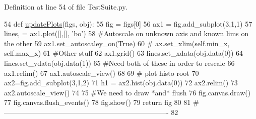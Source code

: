 Definition at line 54 of file Test\+Suite.\+py.


\begin{DoxyCode}
54 \textcolor{keyword}{def }\hyperlink{namespaceTestSuite_afd38321f5736c9a017d24fcee3206fed}{updatePlots}(figs, obj):
55     fig = figs[0]
56     ax1 = fig.add\_subplot(3,1,1)
57     lines, = ax1.plot([],[], \textcolor{stringliteral}{'bo'})
58     \textcolor{comment}{#Autoscale on unknown axis and known lims on the other}
59     ax1.set\_autoscaley\_on(\textcolor{keyword}{True})
60 \textcolor{comment}{#    ax.set\_xlim(self.min\_x, self.max\_x)}
61     \textcolor{comment}{#Other stuff}
62     ax1.grid()        
63     lines.set\_xdata(obj.data(0))
64     lines.set\_ydata(obj.data(1))
65     \textcolor{comment}{#Need both of these in order to rescale}
66     ax1.relim()
67     ax1.autoscale\_view()
68 
69     \textcolor{comment}{# plot histo root}
70     ax2=fig.add\_subplot(3,1,2)
71     h1 = ax2.hist(obj.data(0))
72     ax2.relim()
73     ax2.autoscale\_view()
74 
75     \textcolor{comment}{#We need to draw *and* flush}
76     fig.canvas.draw()
77     fig.canvas.flush\_events()
78     fig.show()
79     \textcolor{keywordflow}{return} fig
80     
81 \textcolor{comment}{#----------------------------------------------------------------------}
82 
\end{DoxyCode}

